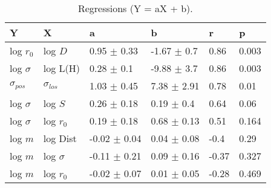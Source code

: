 \begin{table}
\centering
\caption{Regressions (Y = aX + b).}
\begin{tabular}{llllll}
\toprule
              Y &               X &                 a &                b &      r &      p \\
\midrule
      log $r_0$ &         log $D$ &   0.95 $\pm$ 0.33 &  -1.67 $\pm$ 0.7 &   0.86 &  0.003 \\
   log $\sigma$ &        log L(H) &    0.28 $\pm$ 0.1 &  -9.88 $\pm$ 3.7 &   0.86 &  0.003 \\
 $\sigma_{pos}$ &  $\sigma_{los}$ &   1.03 $\pm$ 0.45 &  7.38 $\pm$ 2.91 &   0.78 &   0.01 \\
   log $\sigma$ &         log $S$ &   0.26 $\pm$ 0.18 &   0.19 $\pm$ 0.4 &   0.64 &   0.06 \\
   log $\sigma$ &     log $r_{0}$ &   0.19 $\pm$ 0.18 &  0.68 $\pm$ 0.13 &   0.51 &  0.164 \\
        log $m$ &        log Dist &  -0.02 $\pm$ 0.04 &  0.04 $\pm$ 0.08 &   -0.4 &   0.29 \\
        log $m$ &    log $\sigma$ &  -0.11 $\pm$ 0.21 &  0.09 $\pm$ 0.16 &  -0.37 &  0.327 \\
        log $m$ &     log $r_{0}$ &  -0.02 $\pm$ 0.07 &  0.01 $\pm$ 0.05 &  -0.28 &  0.469 \\
\bottomrule
\end{tabular}
\end{table}

